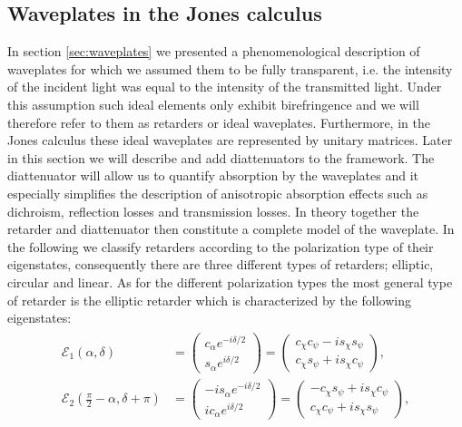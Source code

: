 \subsection{Waveplates in the Jones calculus}
In section \ref{sec:waveplates} we presented a phenomenological description of waveplates for which we assumed them to be fully transparent, i.e. the intensity of the incident light was equal to the intensity of the transmitted light. Under this assumption such ideal elements only exhibit birefringence and we will therefore refer to them as retarders or ideal waveplates. Furthermore, in the Jones calculus these ideal waveplates are represented by unitary matrices. Later in this section we will describe and add diattenuators to the framework. The diattenuator will allow us to quantify absorption by the waveplates and it especially simplifies the description of anisotropic absorption effects such as dichroism, reflection losses and transmission losses. In theory together the retarder and diattenuator then constitute a complete model of the waveplate. In the following we classify retarders according to the polarization type of their eigenstates, consequently there are three different types of retarders; elliptic, circular and linear. As for the different polarization types the most general type of retarder is the elliptic retarder which is characterized by the following eigenstates:
\begin{align}
\begin{split}
    \label{eq:ellip_pol_eigenstates}
    \bm{\mathcal{E}}_1(\alpha, \delta) &= 
    \begin{pmatrix} c_{\alpha} e^{-i\delta /2} \\ s_{\alpha} e^{i\delta /2} \end{pmatrix}
    = 
    \begin{pmatrix} c_{\chi} c_{\psi} - i s_{\chi} s_{\psi} \\ 
    c_{\chi} s_{\psi} + i s_{\chi} c_{\psi} \end{pmatrix},
    \\
    \bm{\mathcal{E}}_2 \left( \frac{\pi}{2} - \alpha, \delta+\pi \right) &= 
    \begin{pmatrix} -i s_{\alpha} e^{-i\delta /2} \\ i c_{\alpha} e^{i\delta /2} \end{pmatrix}
    = 
    \begin{pmatrix} -c_{\chi} s_{\psi} + i s_{\chi} c_{\psi} \\ 
    c_{\chi} c_{\psi} + i s_{\chi} s_{\psi} \end{pmatrix},
\end{split}
\end{align}
